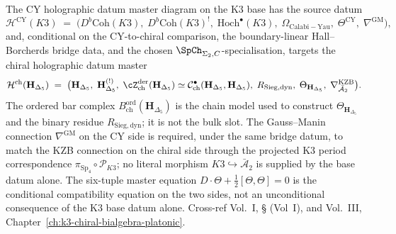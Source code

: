 \begin{remark}
\label{rem:cyhdm-cross-volume-opener}
The CY holographic datum master diagram on the K3 base has the source datum
\[
\mathcal H^{\mathrm{CY}}(K3) \;=\; \bigl(D^b\mathrm{Coh}(K3),\; D^b\mathrm{Coh}(K3)^!,\; \mathrm{Hoch}^\bullet(K3),\; \Omega_{\mathrm{Calabi-Yau}},\; \Theta^{\mathrm{CY}},\; \nabla^{\mathrm{GM}}\bigr),
\]
and, conditional on the CY-to-chiral comparison, the boundary-linear
Hall--Borcherds bridge data, and the chosen
$\SpCh_{\Sigma_2,C}$-specialisation, targets the chiral holographic
datum master
\[
\mathcal H^{\mathrm{ch}}(\mathbf H_{\Delta_5}) \;=\; \bigl(
\mathbf H_{\Delta_5},\; \mathbf H_{\Delta_5}^{(!)},\;
\cZ^{\mathrm{der}}_{\mathrm{ch}}(\mathbf H_{\Delta_5})
\simeq \mathcal C^\bullet_{\mathrm{ch}}(\mathbf H_{\Delta_5},
\mathbf H_{\Delta_5}),\; R_{\mathrm{Sieg,dyn}},\;
\Theta_{\mathbf H_{\Delta_5}},\; \nabla^{\mathrm{KZB}}_{\bar{\mathcal A}_2}
\bigr).
\]
The ordered bar complex
$B^{\mathrm{ord}}_{\mathrm{ch}}(\mathbf H_{\Delta_5})$ is the chain model
used to construct $\Theta_{\mathbf H_{\Delta_5}}$ and the binary residue
$R_{\mathrm{Sieg,dyn}}$; it is not the bulk slot.
The Gauss--Manin connection $\nabla^{\mathrm{GM}}$ on the CY side
is required, under the same bridge datum, to match the KZB connection on
the chiral side through the projected K3 period correspondence
\(\pi_{\mathrm{Sp}_4}\circ\mathscr P_{K3}\); no literal morphism
$K3\hookrightarrow\bar{\mathcal A}_2$ is supplied by the base datum alone.
The six-tuple master equation
$D\cdot\Theta + \tfrac{1}{2}[\Theta,\Theta] = 0$ is the conditional compatibility
equation on the two sides, not an unconditional consequence of the K3 base datum alone.
Cross-ref Vol.~I, \S\cite{VolI} (Vol~I), and Vol.~III,
Chapter~\ref{ch:k3-chiral-bialgebra-platonic}.
\end{remark}
